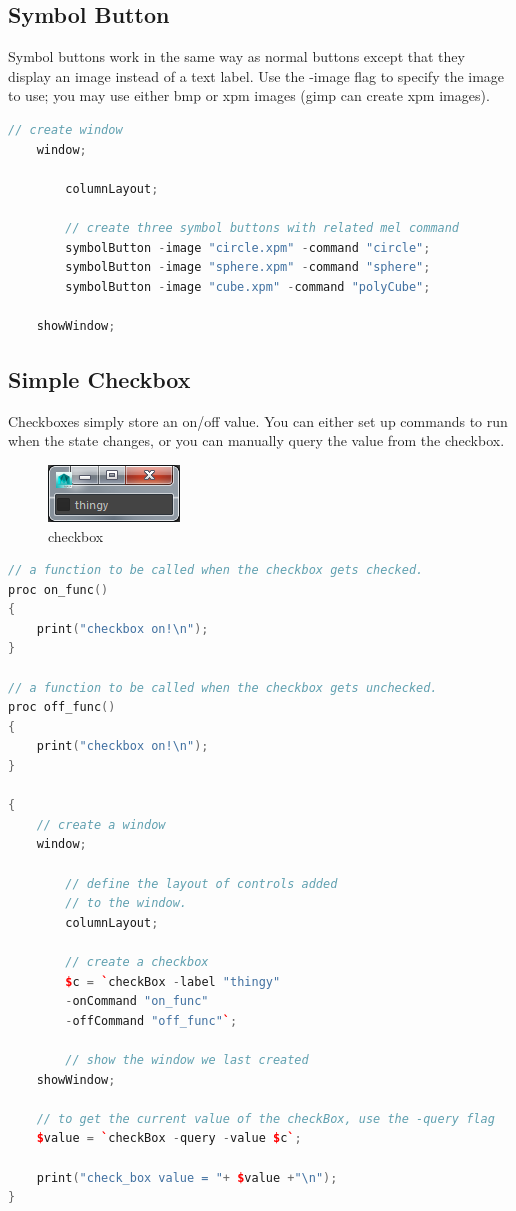 \subsection{Symbol Button}
Symbol buttons work in the same way as normal buttons except that they display an image instead of a text label. Use the -image flag to specify the image to use; you may use either bmp or xpm images (gimp can create xpm images).

\begin{lstlisting}[language = C++]
	// create window
	window;
	
		columnLayout;
		
		// create three symbol buttons with related mel command
		symbolButton -image "circle.xpm" -command "circle";
		symbolButton -image "sphere.xpm" -command "sphere";
		symbolButton -image "cube.xpm" -command "polyCube";
		
	showWindow;
\end{lstlisting}

\subsection{Simple Checkbox}
Checkboxes simply store an on/off value. You can either set up commands to run when the state changes, or you can manually query the value from the checkbox.

\begin{figure}[tbh]
	\centering
	\includegraphics[width=0.2\linewidth]{figures/GUI/checkbox}
	\caption{checkbox}
	\label{fig:checkbox}
\end{figure}

\begin{lstlisting}[language = C++]
// a function to be called when the checkbox gets checked.
proc on_func() 
{
	print("checkbox on!\n");
}

// a function to be called when the checkbox gets unchecked.
proc off_func() 
{
	print("checkbox on!\n");
}

{
	// create a window
	window;
	
		// define the layout of controls added 
		// to the window.
		columnLayout;
		
		// create a checkbox
		$c = `checkBox -label "thingy" 
		-onCommand "on_func" 
		-offCommand "off_func"`;
		
		// show the window we last created
	showWindow;
	
	// to get the current value of the checkBox, use the -query flag
	$value = `checkBox -query -value $c`;
	
	print("check_box value = "+ $value +"\n");
}
\end{lstlisting}

